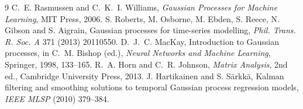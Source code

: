 \documentclass[11pt,a4paper]{article}
\begin{document}
\begin{thebibliography}{9}
 C.~E. Rasmussen and C.~K.~I. Williams, \emph{Gaussian Processes for Machine Learning},
  MIT Press, 2006.
 S. Roberts, M. Osborne, M. Ebden, S. Reece, N. Gibson and S. Aigrain,
  Gaussian processes for time-series modelling, \emph{Phil. Trans. R. Soc. A} 371 (2013) 20110550.
 D.~J.~C. MacKay, Introduction to Gaussian processes, in C.~M. Bishop (ed.),
  \emph{Neural Networks and Machine Learning}, Springer, 1998, 133--165.
 R.~A. Horn and C.~R. Johnson, \emph{Matrix Analysis}, 2nd ed., Cambridge University Press, 2013.
 J. Hartikainen and S. S\"arkk\"a, Kalman filtering and smoothing solutions to temporal
  Gaussian process regression models, \emph{IEEE MLSP} (2010) 379--384.
\end{thebibliography}
\end{document}
